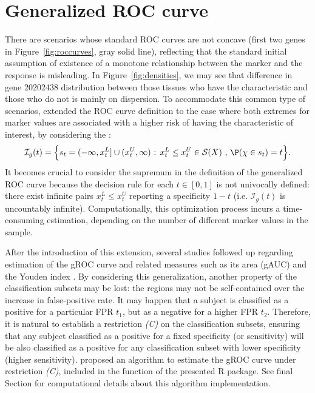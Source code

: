 
\section{Generalized ROC curve} \label{section:groc}

There are scenarios whose standard ROC curves are not concave (first two genes in Figure~\ref{fig:roccurves}, gray solid line), reflecting that the standard initial assumption of existence of a monotone relationship between the marker and the response is misleading. In Figure~\ref{fig:densities}, we may see that difference in gene 20202438 distribution between those tissues who have the characteristic and those who do not is mainly on dispersion. To accommodate this common type of scenarios, \citet{Camblor2017a} extended the ROC curve definition to the case where both extremes for marker values are associated with a higher risk of having the characteristic of interest, by considering the :
$$\mathcal{I}_g(t) = \Big\{ s_t = (-\infty,x_t^L] \cup (x_t^U, \infty) \mbox{ : } x_t^L \leq x_t^U \in \mathcal{S}(X) \mbox{ , } \P(\chi \in s_t) = t \Big\}.$$
It becomes crucial to consider the supremum in the definition of the generalized ROC curve because the decision rule for each $t \in [0,1]$ is not univocally defined: there exist infinite pairs $x_t^L \leq x_t^U$ reporting a specificity $1-t$ (i.e. $\mathcal{I}_g(t)$ is uncountably infinite).
Computationally, this optimization process incurs a time-consuming estimation, depending on the number of different marker values in the sample.

After the introduction of this extension, several studies followed up regarding estimation of the gROC curve \citep{Camblor2017a, Camblor2019b} and related measures such as its area (gAUC) \citep{Camblor2021a} and the Youden index \citep{Camblor2019c, Bantis2021a}.
By considering this generalization, another property of the classification subsets may be lost: the regions may not be self-contained over the increase in false-positive rate. It may happen that a subject is classified as a positive for a particular FPR $t_1$, but as a negative for a higher FPR $t_2$. Therefore, it is natural to establish a restriction \textit{(C)} on the classification subsets, ensuring that any subject classified as a positive for a fixed specificity (or sensitivity) will be also classified as a positive for any classification subset with lower specificity (higher sensitivity). \citet{PerezFernandez2020} proposed an algorithm to estimate the gROC curve under restriction \textit{(C)}, included in the  function of the presented R package. See final Section for computational details about this algorithm implementation.

